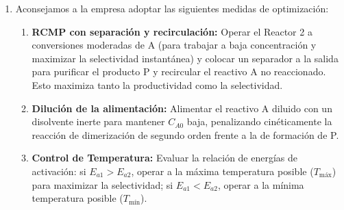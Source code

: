 \begin{enumerate}[label={\alph*)}]
	\item Aconsejamos a la empresa adoptar las siguientes medidas de optimización:
	      \begin{enumerate}[label={\arabic*.}]
		      \item \textbf{RCMP con separación y recirculación:} Operar el Reactor 2 a conversiones moderadas de A (para trabajar a baja concentración y maximizar la selectividad instantánea) y colocar un separador a la salida para purificar el producto P y recircular el reactivo A no reaccionado. Esto maximiza tanto la productividad como la selectividad.
		      \item \textbf{Dilución de la alimentación:} Alimentar el reactivo A diluido con un disolvente inerte para mantener $C_{A0}$ baja, penalizando cinéticamente la reacción de dimerización de segundo orden frente a la de formación de P.
		      \item \textbf{Control de Temperatura:} Evaluar la relación de energías de activación: si $E_{a1} > E_{a2}$, operar a la máxima temperatura posible ($T_{\text{máx}}$) para maximizar la selectividad; si $E_{a1} < E_{a2}$, operar a la mínima temperatura posible ($T_{\text{mín}}$).
	      \end{enumerate}
\end{enumerate}
\newpage
